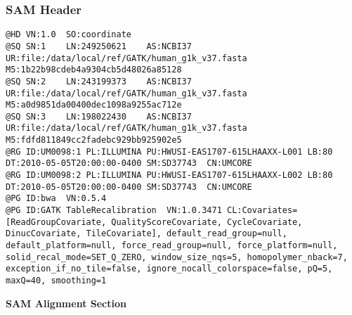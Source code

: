 \documentclass{beamer}
\newcommand{\centeredtitle}[1]{
\begin{center}
    \Huge{\bf{#1}}
\end{center}
}
\newcommand{\hugeslide}[1]{
\begin{frame}
\centeredtitle{#1}
\end{frame}
}
\begin{document}
\begin{frame}[fragile]
\frametitle{SAM Header}
\begin{framed}\tiny
\begin{verbatim}
@HD	VN:1.0	SO:coordinate
@SQ	SN:1	LN:249250621	AS:NCBI37	UR:file:/data/local/ref/GATK/human_g1k_v37.fasta	M5:1b22b98cdeb4a9304cb5d48026a85128
@SQ	SN:2	LN:243199373	AS:NCBI37	UR:file:/data/local/ref/GATK/human_g1k_v37.fasta	M5:a0d9851da00400dec1098a9255ac712e
@SQ	SN:3	LN:198022430	AS:NCBI37	UR:file:/data/local/ref/GATK/human_g1k_v37.fasta	M5:fdfd811849cc2fadebc929bb925902e5
@RG	ID:UM0098:1	PL:ILLUMINA	PU:HWUSI-EAS1707-615LHAAXX-L001	LB:80	DT:2010-05-05T20:00:00-0400	SM:SD37743	CN:UMCORE
@RG	ID:UM0098:2	PL:ILLUMINA	PU:HWUSI-EAS1707-615LHAAXX-L002	LB:80	DT:2010-05-05T20:00:00-0400	SM:SD37743	CN:UMCORE
@PG	ID:bwa	VN:0.5.4
@PG	ID:GATK TableRecalibration	VN:1.0.3471	CL:Covariates=[ReadGroupCovariate, QualityScoreCovariate, CycleCovariate, DinucCovariate, TileCovariate], default_read_group=null, default_platform=null, force_read_group=null, force_platform=null, solid_recal_mode=SET_Q_ZERO, window_size_nqs=5, homopolymer_nback=7, exception_if_no_tile=false, ignore_nocall_colorspace=false, pQ=5, maxQ=40, smoothing=1
\end{verbatim}
\end{framed}
\end{frame}

\hugeslide{SAM Alignment Section}
\end{document}
